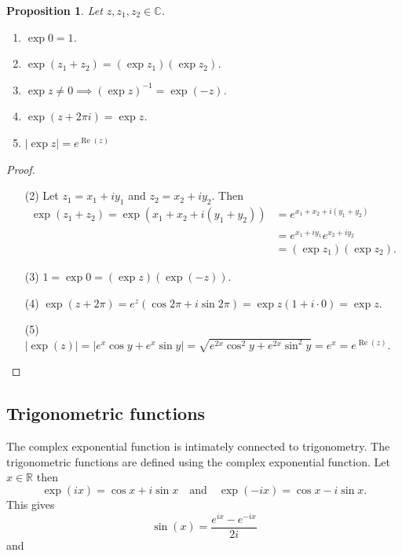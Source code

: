 \documentclass[12pt,openany]{book}
\newtheorem{proposition}[theorem]{Proposition}
\theoremstyle{definition}
\newcommand{\R}{\mathbb{R}}
\newcommand{\C}{\mathbb{C}}
\newcommand{\of}[1]{\left( #1 \right)}
\newcommand{\abs}[1]{\left\lvert #1 \right\rvert}
\newcommand{\inv}[1]{{#1}^{-1}}
\renewcommand{\Re}{\operatorname{Re}}
\begin{document}
	\begin{tcolorbox}[colback=white,colframe=procolor,arc=5pt,title={\color{white}\bf Properties of Complex Expoenential}]
		\begin{proposition}
			Let $z,z_1,z_2\in\C$. \begin{enumerate}[(1)]
				\item $\exp 0 = 1$.
				\item $\exp\of{z_1+z_2}=(\exp z_1)(\exp z_2)$.
				\item $\exp z\neq 0\implies\inv{\of{\exp z}}=\exp(-z)$.
				\item $\exp(z+2\pi i)=\exp z$.
				\item $\abs{\exp z}=e^{\Re\of{z}}$
			\end{enumerate}
		\end{proposition}
	\end{tcolorbox}
	\begin{proof}
		\begin{itemize}
			\item[(2)] Let $z_1=x_1+iy_1$ and $z_2=x_2+iy_2$. Then \begin{align*}
				\exp\of{z_1+z_2}=\exp\of{x_1+x_2+i(y_1+y_2)}&=e^{x_1+x_2+i(y_1+y_2)}\\
				&=e^{x_1+iy_1}e^{x_2+iy_2}\\
				&=\of{\exp z_1}\of{\exp z_2}.
			\end{align*}
			\item[(3)] $1=\exp 0=\of{\exp z}\of{\exp (-z)}$.
			\item[(4)] $\exp (z+2\pi)=e^z\of{\cos 2\pi+i\sin 2\pi}=\exp z(1+i\cdot 0)=\exp z$.
			\item[(5)] $\abs{\exp\of{z}}=\abs{e^x\cos y+e^x\sin y}=\sqrt{e^{2x}\cos^2y+e^{2x}\sin^2y}=e^x=e^{\Re\of{z}}$.
		\end{itemize}
	\end{proof}
	
	\newpage
	\subsection{Trigonometric functions}
	The complex exponential function is intimately connected to trigonometry. The trigonometric functions are defined using the complex exponential function. Let $x\in\R$ then \[
	\exp\of{ix}=\cos x+i\sin x\quad\text{and}\quad\exp\of{-ix}=\cos x-i\sin x.
	\] This gives
	\begin{equation*}
		\sin(x) = \frac{e^{ix} - e^{-ix}}{2i}
	\end{equation*} and
	
\end{document}
